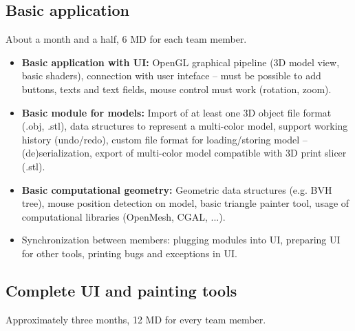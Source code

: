 \subsection{Basic application}

About a month and a half, 6 MD for each team member.

\begin{itemize}
\item \textbf{Basic application with UI:} OpenGL graphical pipeline (3D model view, basic shaders), connection with user inteface -- must be possible to add buttons, texts and text fields, mouse control must work (rotation, zoom).
\item \textbf{Basic module for models:} Import of at least one 3D object file format (.obj, .stl), data structures to represent a multi-color model, support working history (undo/redo), custom file format for loading/storing model -- (de)serialization, export of multi-color model compatible with 3D print slicer (.stl).
\item \textbf{Basic computational geometry:} Geometric data structures (e.g. BVH tree), mouse position detection on model, basic triangle painter tool, usage of computational libraries (OpenMesh, CGAL, ...).
\item Synchronization between members: plugging modules into UI, preparing UI for other tools, printing bugs and exceptions in UI.
\end{itemize}


\subsection{Complete UI and painting tools}

Approximately three months, 12 MD for every team member.

